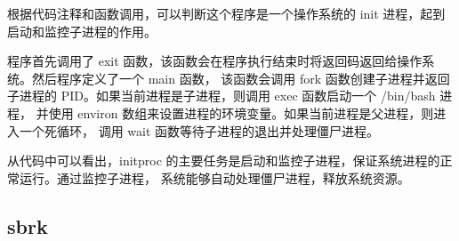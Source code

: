 根据代码注释和函数调用，可以判断这个程序是一个操作系统的 init 进程，起到启动和监控子进程的作用。

程序首先调用了 exit 函数，该函数会在程序执行结束时将返回码返回给操作系统。然后程序定义了一个 main 函数，
该函数会调用 fork 函数创建子进程并返回子进程的 PID。如果当前进程是子进程，则调用 exec 函数启动一个 /bin/bash 进程，
并使用 environ 数组来设置进程的环境变量。如果当前进程是父进程，则进入一个死循环，
调用 wait 函数等待子进程的退出并处理僵尸进程。

从代码中可以看出，initproc 的主要任务是启动和监控子进程，保证系统进程的正常运行。通过监控子进程，
系统能够自动处理僵尸进程，释放系统资源。


\subsection{sbrk}